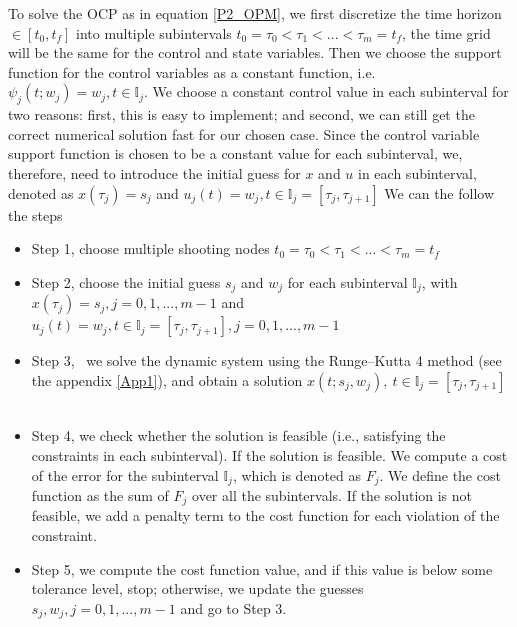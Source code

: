 \documentclass  [
  paper    = a4,
  BCOR     = 10mm,
  twoside,
  fontsize = 12pt,
  fleqn,
  toc      = bibnumbered,
  toc      = listofnumbered,
  numbers  = noendperiod,
  headings = normal,
  listof   = leveldown,
  version  = 3.03
]                                       {scrreprt}
\newcommand{\<}{\langle}
\renewcommand{\>}{\rangle}
\begin{document}
To solve the OCP as in equation \ref{P2_OPM}, we first discretize the time horizon $ \in [t_0, t_f]$ into multiple subintervals $t_0 = \tau_0 < \tau_1 < ... < \tau_m = t_f$, the time grid will be the same for the control and state variables. Then we choose the support function for the control variables as a constant function, i.e. $ \psi_j(t;w_j)= w_j, t \in \mathbb{I}_j$. We choose a constant control value in each subinterval for two reasons: first, this is easy to implement; and second, we can still get the correct numerical solution fast for our chosen case. Since the control variable support function is chosen to be a constant value for each subinterval, we, therefore, need to introduce the initial guess for $x$ and $u$ in each subinterval, denoted as $x(\tau_j) = s_j$ and $u_j(t) = w_j, t \in \mathbb{I}_j = [\tau_j, \tau_{j+1}]$
We can the follow the steps
\begin{itemize}
	\item Step 1, choose multiple shooting nodes $t_0 = \tau_0 < \tau_1 < ... < \tau_m = t_f$ 
	\item Step 2, choose the initial guess $s_j$ and $w_j$ for each subinterval $\mathbb{I}_j$, with $x(\tau_j) = s_j, j = 0, 1, ..., m-1$ and $u_j(t) = w_j, t \in \mathbb{I}_j = [\tau_j, \tau_{j+1}], j =0, 1, ..., m-1$ 
	\item Step 3,  we solve the dynamic system using the Runge–Kutta 4 method (see the appendix \ref{App1}), and obtain a solution $x(t; s_j, w_j), \ t  \in \mathbb{I}_j =[\tau_j, \tau_{j+1}]$  
	\item Step 4, we check whether the solution is feasible (i.e., satisfying the constraints in each subinterval). If the solution is feasible. We compute a cost of the error for the subinterval $\mathbb{I}_j$, which is denoted as $F_j$. We define the cost function as the sum of $F_j$ over all the subintervals. If the solution is not feasible, we add a penalty term to the cost function for each violation of the constraint. 
	\item Step 5, we compute the cost function value, and if this value is below some tolerance level, stop; otherwise, we update the guesses $s_j, w_j, j =0, 1, ..., m-1$ and go to Step 3.
\end{itemize}
\end{document}
